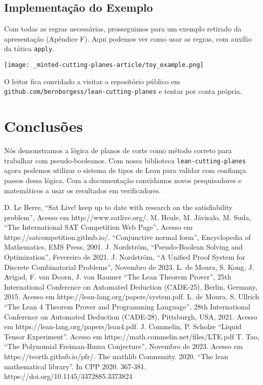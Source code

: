 \documentclass[conference]{IEEEtran}
\begin{document}

\newpage
\subsection{Implementação do Exemplo}
Com todas as regras necessárias, prosseguimos para um exemplo retirado da apresentação
(Apêndice F). Aqui podemos ver como usar as regras, com auxílio da tática \texttt{apply}.

\texttt{[image: \_minted-cutting-planes-article/toy\_example.png]}

O leitor fica convidado a visitar o repositório público em \texttt{github.com/bernborgess/lean-cutting-planes}
e tentar por conta própria.


\section*{Conclusões}
Nós demonstramos a lógica de planos de corte como método correto para trabalhar com pseudo-booleanos.
Com nossa biblioteca \texttt{lean-cutting-planes} agora podemos utilizar o sistema de tipos de Lean
para validar com confiança passos dessa lógica. Com a documentação convidamos novos pesquisadores e
matemáticos a usar os resultados em verificadores.


\begin{thebibliography}{00}
           D. Le Berre, ``Sat Live! keep up to date with research on the satisfiability problem'', Acesso em http://www.satlive.org/.
           M. Heule, M. Jävisalo, M. Suda, ``The International SAT Competition Web Page'', Acesso em https://satcompetition.github.io/.
               ``Conjunctive normal form'', Encyclopedia of Mathematics, EMS Press, 2001.
           J. Nordström, ``Pseudo-Boolean Solving and Optimization'', Fevereiro de 2021.
          J. Nordström, ``A Unified Proof System for Discrete Combinatorial Problems'', Novembro de 2023.
        L. de Moura, S. Kong, J. Avigad, F. van Doorn, J. von Raumer ``The Lean Theorem Prover'', 25th International Conference on Automated Deduction (CADE-25), Berlin, Germany, 2015. Acesso em https://lean-lang.org/papers/system.pdf.
             L. de Moura, S. Ullrich ``The Lean 4 Theorem Prover and Programming Language'', 28th International Conference on Automated Deduction (CADE-28), Pittsburgh, USA, 2021. Acesso em https://lean-lang.org/papers/lean4.pdf.
               J. Commelin, P. Scholze ``Liquid Tensor Experiment''. Acesso em https://math.commelin.net/files/LTE.pdf
               T. Tao, ``The Polynomial Freiman-Ruzsa Conjecture'', Novembro de 2023. Acesso em https://teorth.github.io/pfr/.
          The mathlib Community. 2020. ``The lean mathematical library''. In CPP 2020. 367-381. https://doi.org/10.1145/3372885.3373824
\end{thebibliography}
\end{document}

